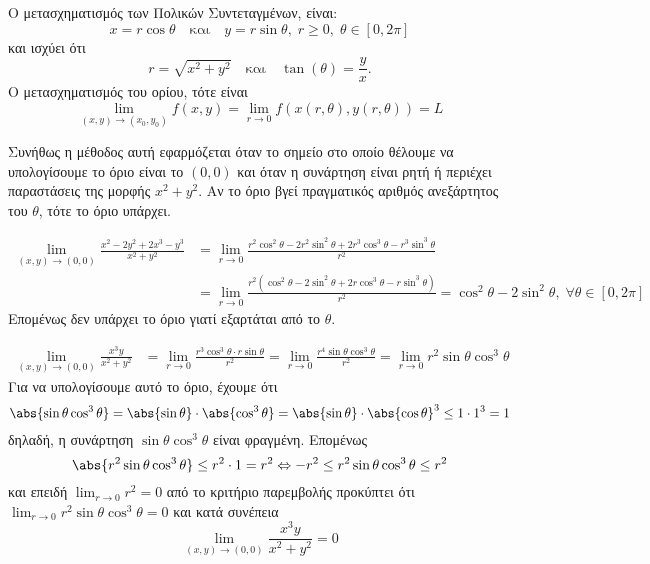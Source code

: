 \begin{rem}
\item {}
  \begin{myitemize}
    \item Ο μετασχηματισμός των Πολικών Συντεταγμένων, είναι:
      \[
        x = r \cos{\theta} \quad \text{και} \quad y = r \sin{\theta}, 
        \; r \geq 0, \; \theta \in [0, 2 \pi]
      \] 
      και ισχύει ότι 
      \[
        r = \sqrt{x^{2}+y^{2}} \quad \text{και} \quad \tan(\theta) = \frac{y}{x}.
      \] 
      Ο μετασχηματισμός του ορίου, τότε είναι 
      \[
        \lim\limits_{(x,y)\to (x_{0}, y_{0})} f(x,y) = 
        \lim_{r \to 0} f(x(r, \theta ), y(r, \theta)) = L
      \] 

    \item Συνήθως η μέθοδος αυτή εφαρμόζεται όταν το σημείο στο οποίο θέλουμε να 
      υπολογίσουμε το όριο είναι το $ (0,0) $ και όταν η συνάρτηση είναι ρητή ή 
      περιέχει παραστάσεις της μορφής $ x^{2}+y^{2} $. Αν το όριο βγεί 
      πραγματικός αριθμός ανεξάρτητος του $\theta$, τότε το όριο υπάρχει.
  \end{myitemize}
\end{rem}

\begin{example}
  \begin{align*} \lim\limits_{(x,y)\to (0, 0)} 
    \frac{x^{2}-2y^{2}+2x^{3}-y^{3}}{x^{2}+y^{2}} 
               &= \lim_{r \to 0} \frac{r^{2} \cos^{2}{\theta} - 2r^{2} \sin^{2}{\theta 
               +2r^{3} \cos^{3}{\theta - r^{3} \sin^{3}{\theta}}}}{r^{2}} \\ 
               &= \lim_{r \to 0} \frac{r^{2}(\cos^{2}{\theta} - 2 \sin^{2}{\theta} +2r 
               \cos^{3}{\theta} - r \sin^{3}{\theta})}{r^{2}} = 
               \cos^{2}{\theta} - 2 \sin^{2}{\theta}, \; \forall \theta \in [0, 2 \pi]
  \end{align*}
  Επομένως δεν υπάρχει το όριο γιατί εξαρτάται από το $\theta$.
\end{example}

\begin{example}
  \begin{align*}
    \lim\limits_{(x,y)\to (0, 0)} \frac{x^{3}y}{x^{2}+y^{2}} &= 
    \lim_{r \to 0} \frac{r^{3} \cos^{3}{\theta} \cdot r 
      \sin{\theta}}{r^{2}} = \lim_{r \to 0} \frac{r^{4} \sin{\theta} 
    \cos^{3}{\theta}}{r^{2}} = 
    \lim_{r \to 0} r^{2} \sin{\theta} \cos^{3}{\theta} 
  \end{align*}
  Για να υπολογίσουμε αυτό το όριο, έχουμε ότι
  \[
    \abs{\sin{\theta} \cos^{3}{\theta}} = \abs{\sin{\theta}} \cdot 
    \abs{\cos^{3}{\theta}} = \abs{\sin{\theta}} \cdot \abs{\cos{\theta}}^{3} \leq 
    1 \cdot 1^{3} = 1 
  \] 
  δηλαδή, η συνάρτηση $ \sin{\theta} \cos^{3}{\theta} $ είναι φραγμένη.
  Επομένως
  \[ 
    \abs{r^{2} \sin{\theta} \cos^{3}{\theta}} \leq r^{2} \cdot 1 = r^{2} \Leftrightarrow 
    -r^{2} \leq r^{2} \sin{\theta} \cos^{3}{\theta} \leq r^{2}
  \] 
  και επειδή $ \lim_{r \to 0} r^{2} = 0 $ από το κριτήριο παρεμβολής προκύπτει ότι 
  $ \lim_{r \to 0} r^{2} \sin{\theta} \cos^{3}{\theta} = 0 $ και κατά συνέπεια
  \[
    \lim\limits_{(x,y)\to (0,0)} \frac{x^{3}y}{x^{2}+y^{2}} = 0
  \] 
\end{example}

